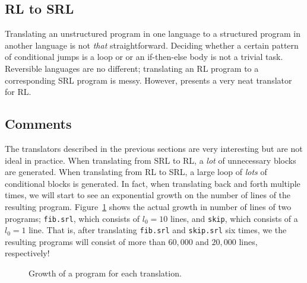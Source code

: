 
\subsection{RL to SRL}

Translating an unstructured program in one language to a structured program in another language is not \textit{that} straightforward. Deciding whether a certain pattern of conditional jumps is a loop or or an if-then-else body is not a trivial task. Reversible languages are no different; translating an RL program to a corresponding SRL program is messy. However, \cite[p.~107]{REV} presents a very neat translator for RL.


\subsection{Comments}
The translators described in the previous sections are very interesting but are not ideal in practice. When translating from SRL to RL, a \textit{lot} of unnecessary blocks are generated. When translating from RL to SRL, a large loop of \textit{lots} of conditional blocks is generated. In fact, when translating back and forth multiple times, we will start to see an exponential growth on the number of lines of the resulting program. Figure~\ref{fig:linesfig} shows the actual growth in number of lines of two programs; \texttt{fib.srl}, which consists of $l_0=10$ lines, and \texttt{skip}, which consists of a $l_0=1$ line. That is, after translating \texttt{fib.srl} and \texttt{skip.srl} six times, we the resulting programs will consist of more than $60,000$ and $20,000$ lines, respectively!

\pgfplotsset{compat = 1.3}
\begin{figure}[H]
\centering


  \caption{Growth of a program for each translation.}\label{fig:linesfig}%
\end{figure}
